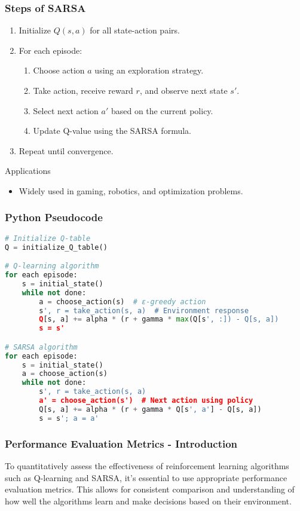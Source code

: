 \documentclass[aspectratio=169]{beamer}
\begin{document}
\begin{frame}[fragile]
    \frametitle{Steps of SARSA}
    \begin{enumerate}
        \item Initialize $Q(s, a)$ for all state-action pairs.
        \item For each episode:
        \begin{enumerate}
            \item Choose action $a$ using an exploration strategy.
            \item Take action, receive reward $r$, and observe next state $s'$.
            \item Select next action $a'$ based on the current policy.
            \item Update Q-value using the SARSA formula.
        \end{enumerate}
        \item Repeat until convergence.
    \end{enumerate}
    
    \begin{block}{Applications}
        \begin{itemize}
            \item Widely used in gaming, robotics, and optimization problems.
        \end{itemize}
    \end{block}
\end{frame}

\begin{frame}[fragile]
    \frametitle{Python Pseudocode}
    \begin{lstlisting}[language=Python]
# Initialize Q-table
Q = initialize_Q_table()

# Q-learning algorithm
for each episode:
    s = initial_state()
    while not done:
        a = choose_action(s)  # ε-greedy action
        s', r = take_action(s, a)  # Environment response
        Q[s, a] += alpha * (r + gamma * max(Q[s', :]) - Q[s, a])
        s = s'

# SARSA algorithm
for each episode:
    s = initial_state()
    a = choose_action(s)
    while not done:
        s', r = take_action(s, a)
        a' = choose_action(s')  # Next action using policy
        Q[s, a] += alpha * (r + gamma * Q[s', a'] - Q[s, a])
        s = s'; a = a'
    \end{lstlisting}
\end{frame}

\begin{frame}[fragile]
    \frametitle{Performance Evaluation Metrics - Introduction}
    To quantitatively assess the effectiveness of reinforcement learning algorithms such as Q-learning and SARSA, it's essential to use appropriate performance evaluation metrics. This allows for consistent comparison and understanding of how well the algorithms learn and make decisions based on their environment.
\end{frame}
\end{document}
